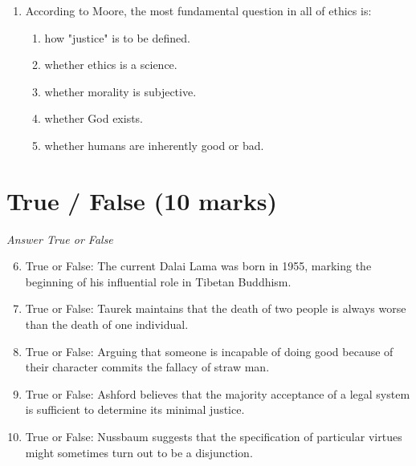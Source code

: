 \documentclass[12pt]{article}
\begin{document}
\begin{enumerate}[label=\arabic*.]
\begin{enumerate}[label=(\alph*)]
    \item The universe is inherently chaotic and unpredictable
    \item God is eternal and merciful to those who offer worship
    \item The world is inherently evil and suffering is inevitable
    \item Life is an illusion and the material world is meaningless
\end{enumerate}
\item According to Moore, the most fundamental question in all of ethics is:
\begin{enumerate}[label=(\alph*)]
    \item how "justice" is to be defined.
    \item whether ethics is a science.
    \item whether morality is subjective.
    \item whether God exists.
    \item whether humans are inherently good or bad.
\end{enumerate}
\end{enumerate}

\section*{True / False (10 marks)}
\textit{Answer True or False}
\begin{enumerate}[label=\arabic*.]
\setcounter{enumi}{5}
\item True or False: The current Dalai Lama was born in 1955, marking the beginning of his influential role in Tibetan Buddhism.
\item True or False: Taurek maintains that the death of two people is always worse than the death of one individual.
\item True or False: Arguing that someone is incapable of doing good because of their character commits the fallacy of straw man.
\item True or False: Ashford believes that the majority acceptance of a legal system is sufficient to determine its minimal justice.
\item True or False: Nussbaum suggests that the specification of particular virtues might sometimes turn out to be a disjunction.
\end{enumerate}
\end{document}
